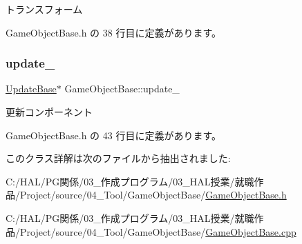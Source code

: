 トランスフォーム 



 Game\+Object\+Base.\+h の 38 行目に定義があります。

\mbox{\label{class_game_object_base_a2051ab9bbbc33c9307ea669f8f7b548b}} 
\subsubsection{\texorpdfstring{update\+\_\+}{update\_}}
{\footnotesize\ttfamily \mbox{\hyperlink{class_update_base}{Update\+Base}}$\ast$ Game\+Object\+Base\+::update\+\_\+\hspace{0.3cm}{\ttfamily [private]}}



更新コンポーネント 



 Game\+Object\+Base.\+h の 43 行目に定義があります。



このクラス詳解は次のファイルから抽出されました\+:\begin{DoxyCompactItemize}
\item 
C\+:/\+H\+A\+L/\+P\+G関係/03\+\_\+作成プログラム/03\+\_\+\+H\+A\+L授業/就職作品/\+Project/source/04\+\_\+\+Tool/\+Game\+Object\+Base/\mbox{\hyperlink{_game_object_base_8h}{Game\+Object\+Base.\+h}}\item 
C\+:/\+H\+A\+L/\+P\+G関係/03\+\_\+作成プログラム/03\+\_\+\+H\+A\+L授業/就職作品/\+Project/source/04\+\_\+\+Tool/\+Game\+Object\+Base/\mbox{\hyperlink{_game_object_base_8cpp}{Game\+Object\+Base.\+cpp}}\end{DoxyCompactItemize}
